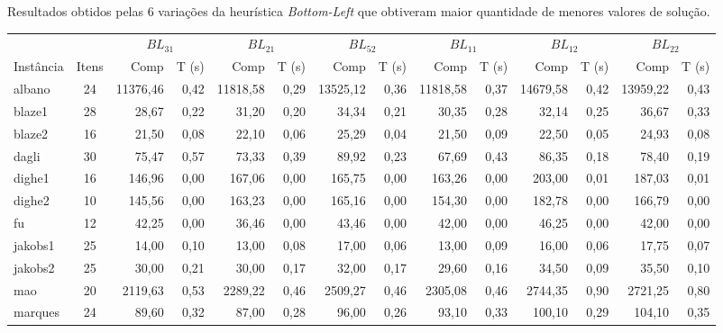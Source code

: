 \documentclass[12pt, openright, twoside, a4paper, english, brazilian]{USPSC-classe/USPSC}
\newcommand{\lgray}{\cellcolor{lightgray}}
\begin{document}
\begin{adjustwidth}{-2cm}{-2.5 cm}\centering\begin{threeparttable}[!htb]\centering
\renewcommand{\arraystretch}{1.2}%
    \caption{Resultados obtidos pelas 6 variações da heurística {\it Bottom-Left} que obtiveram maior quantidade de menores valores de solução.}
    \scriptsize{
        \begin{tabular}{|l|c|rr|rr|rr|rr|rr|rr|}\hline
        \multicolumn{1}{|c|}{} & \multicolumn{1}{c|}{} &  \multicolumn{2}{c|}{$BL_{31}$} & \multicolumn{2}{c|}{$BL_{21}$} & \multicolumn{2}{c|}{$BL_{52}$} &
        \multicolumn{2}{c|}{$BL_{11}$} &
        \multicolumn{2}{c|}{$BL_{12}$} &
        \multicolumn{2}{c|}{$BL_{22}$}\\
            Instância &Itens &Comp &T (s) &Comp &T (s) &Comp &T (s) &Comp &T (s) &Comp &T (s) &Comp &T (s) \\\hline
            albano &24  &\lgray11376,46 &0,42  &11818,58 &0,29  &13525,12 &0,36  &11818,58 &0,37  &14679,58 &0,42  &13959,22 &0,43 \\
            blaze1 &28  &\lgray28,67 &0,22  &31,20 &0,20  &34,34 &0,21  &30,35 &0,28  &32,14 &0,25  &36,67 &0,33 \\
            blaze2 &16  &\lgray21,50 &0,08  &22,10 &0,06  &25,29 &0,04  &\lgray21,50 &0,09  &22,50 &0,05  &24,93 &0,08 \\
            dagli &30  &75,47 &0,57  &73,33 &0,39  &89,92 &0,23  &\lgray67,69 &0,43  &86,35 &0,18  &78,40 &0,19 \\
            dighe1 &16  &\lgray146,96 &0,00  &167,06 &0,00  &165,75 &0,00  &163,26 &0,00  &203,00 &0,01  &187,03 &0,01 \\
            dighe2 &10  &\lgray145,56 &0,00  &163,23 &0,00  &165,16 &0,00  &154,30 &0,00  &182,78 &0,00  &166,79 &0,00 \\
            fu &12  &42,25 &0,00  &\lgray36,46 &0,00  &43,46 &0,00  &42,00 &0,00  &46,25 &0,00  &42,00 &0,00 \\
            jakobs1 &25  &14,00 &0,10  &\lgray13,00 &0,08  &17,00 &0,06  &\lgray13,00 &0,09  &16,00 &0,06  &17,75 &0,07 \\
            jakobs2 &25  &30,00 &0,21  &30,00 &0,17  &32,00 &0,17  &29,60 &0,16  &34,50 &0,09  &35,50 &0,10 \\
            mao &20  &\lgray2119,63 &0,53  &2289,22 &0,46  &2509,27 &0,46  &2305,08 &0,46  &2744,35 &0,90  &2721,25 &0,80 \\
            marques &24  &89,60 &0,32  &\lgray87,00 &0,28  &96,00 &0,26  &93,10 &0,33  &100,10 &0,29  &104,10 &0,35 \\

\end{tabular}}
\end{threeparttable}
\end{adjustwidth}
\end{document}
